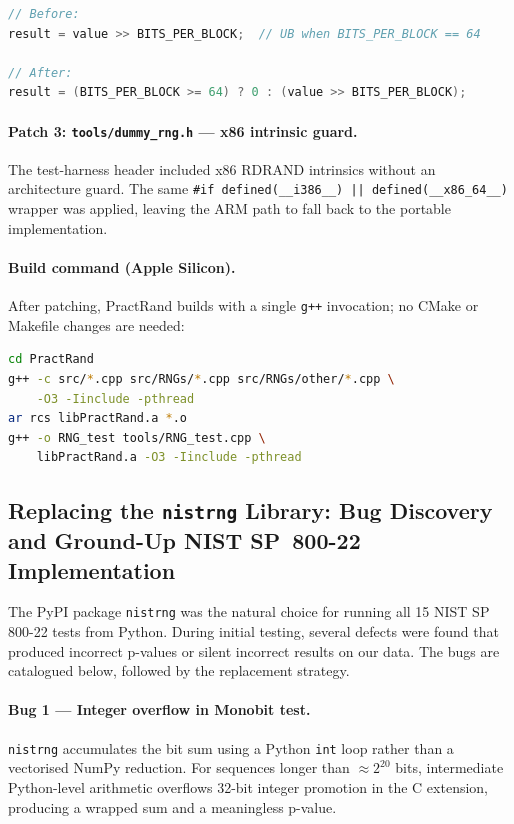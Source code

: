 \documentclass[10pt,twocolumn]{article}
\begin{document}
\begin{lstlisting}[language=C++,caption={tests\_other.cpp --- UB shift guard}]
// Before:
result = value >> BITS_PER_BLOCK;  // UB when BITS_PER_BLOCK == 64

// After:
result = (BITS_PER_BLOCK >= 64) ? 0 : (value >> BITS_PER_BLOCK);
\end{lstlisting}

\paragraph{Patch 3: \texttt{tools/dummy\_rng.h} --- x86 intrinsic guard.}
The test-harness header included x86 RDRAND intrinsics without an
architecture guard.
The same \texttt{\#if defined(\_\_i386\_\_) || defined(\_\_x86\_64\_\_)}
wrapper was applied, leaving the ARM path to fall back to the portable
implementation.

\paragraph{Build command (Apple Silicon).}
After patching, PractRand builds with a single \texttt{g++} invocation;
no CMake or Makefile changes are needed:

\begin{lstlisting}[language=bash,caption={PractRand build on macOS (Apple Silicon)}]
cd PractRand
g++ -c src/*.cpp src/RNGs/*.cpp src/RNGs/other/*.cpp \
    -O3 -Iinclude -pthread
ar rcs libPractRand.a *.o
g++ -o RNG_test tools/RNG_test.cpp \
    libPractRand.a -O3 -Iinclude -pthread
\end{lstlisting}

\subsection{Replacing the \texttt{nistrng} Library: Bug Discovery and
            Ground-Up NIST SP~800-22 Implementation}
\label{sec:nistrng-bugs}

The PyPI package \texttt{nistrng} was the natural choice for running all
15 NIST SP 800-22 tests from Python.
During initial testing, several defects were found that produced
incorrect p-values or silent incorrect results on our data.
The bugs are catalogued below, followed by the replacement strategy.

\paragraph{Bug 1 --- Integer overflow in Monobit test.}
\texttt{nistrng} accumulates the bit sum using a Python \texttt{int} loop
rather than a vectorised NumPy reduction.
For sequences longer than $\approx$$2^{20}$ bits, intermediate
Python-level arithmetic overflows 32-bit integer promotion in the C
extension, producing a wrapped sum and a meaningless p-value.
\end{document}
